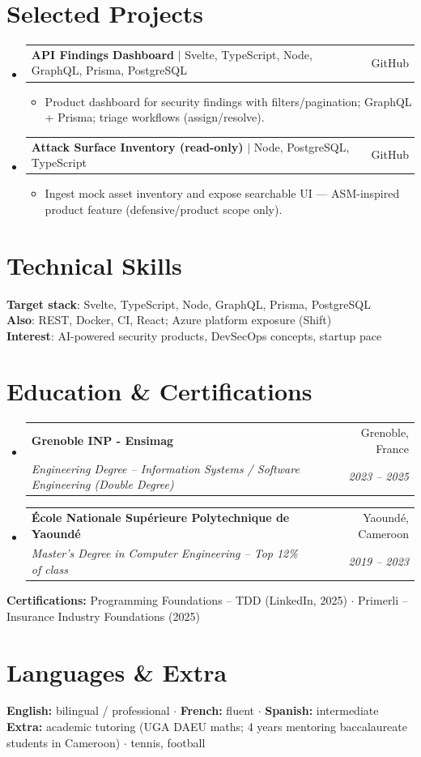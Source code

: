 \documentclass[letterpaper,10.5pt]{article}
\makeatletter
\newcommand{\resumeItem}[1]{\item\small{#1 \vspace{-1.5pt}}}
\newcommand{\resumeSubheading}[4]{
  \vspace{-1pt}\item
    \begin{tabular*}{0.97\textwidth}[t]{l@{\extracolsep{\fill}}r}
      \textbf{#1} & #2 \\
      \textit{\small#3} & \textit{\small #4} \\
    \end{tabular*}\vspace{-5pt}
}
\newcommand{\resumeProjectHeading}[2]{
    \item
    \begin{tabular*}{0.97\textwidth}{l@{\extracolsep{\fill}}r}
      \small#1 & #2 \\
    \end{tabular*}\vspace{-5pt}
}
\newcommand{\resumeSubHeadingListStart}{\begin{itemize}[leftmargin=0.15in, label={}]}
\newcommand{\resumeSubHeadingListEnd}{\end{itemize}}
\newcommand{\resumeItemListStart}{\begin{itemize}[leftmargin=0.18in]}
\newcommand{\resumeItemListEnd}{\end{itemize}\vspace{-3pt}}
\makeatother
\begin{document}
\section{Selected Projects}

\resumeSubHeadingListStart

  \resumeProjectHeading
    {\textbf{API Findings Dashboard} $|$ Svelte, TypeScript, Node, GraphQL, Prisma, PostgreSQL}{GitHub}
    \resumeItemListStart
      \resumeItem{Product dashboard for security findings with filters/pagination; GraphQL + Prisma; triage workflows (assign/resolve).}
    \resumeItemListEnd
  \resumeProjectHeading
    {\textbf{Attack Surface Inventory (read-only)} $|$ Node, PostgreSQL, TypeScript}{GitHub}
    \resumeItemListStart
      \resumeItem{Ingest mock asset inventory and expose searchable UI --- ASM-inspired product feature (defensive/product scope only).}
    \resumeItemListEnd
\resumeSubHeadingListEnd

\section{Technical Skills}

\begin{itemize}[leftmargin=0.15in, label={}]
  \small{\item{
\textbf{Target stack}: Svelte, TypeScript, Node, GraphQL, Prisma, PostgreSQL \\
\textbf{Also}: REST, Docker, CI, React; Azure platform exposure (Shift) \\
\textbf{Interest}: AI-powered security products, DevSecOps concepts, startup pace
  }}
\end{itemize}

\section{Education \& Certifications}

\resumeSubHeadingListStart
  \resumeSubheading
    {Grenoble INP - Ensimag}{Grenoble, France}
    {Engineering Degree -- Information Systems / Software Engineering (Double Degree)}{2023 -- 2025}
  \resumeSubheading
    {\'Ecole Nationale Sup\'erieure Polytechnique de Yaound\'e}{Yaound\'e, Cameroon}
    {Master's Degree in Computer Engineering -- Top 12\% of class}{2019 -- 2023}
\resumeSubHeadingListEnd
\small{
\textbf{Certifications:} Programming Foundations -- TDD (LinkedIn, 2025) $\cdot$ Primerli -- Insurance Industry Foundations (2025)
}

\section{Languages \& Extra}
\small{
\textbf{English:} bilingual / professional $\cdot$ \textbf{French:} fluent $\cdot$ \textbf{Spanish:} intermediate \\
\textbf{Extra:} academic tutoring (UGA DAEU maths; 4 years mentoring baccalaureate students in Cameroon) $\cdot$ tennis, football
}
\end{document}
